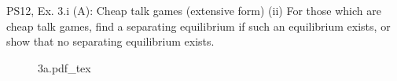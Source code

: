 \begin{frame}{PS12, Ex. 3.i (A): Cheap talk games (extensive form)}
    (ii) For those which are cheap talk games, find a separating equilibrium if such an equilibrium exists, or show that no separating equilibrium exists.\vspace{-6pt}
    \begin{multicols}{2}
      \vfill\null\columnbreak
      \begin{figure}[!h]
        \center{}
        {3a.pdf_tex}
      \end{figure}\vspace{-6pt}
      \vfill\null
    \end{multicols}
\end{frame}
